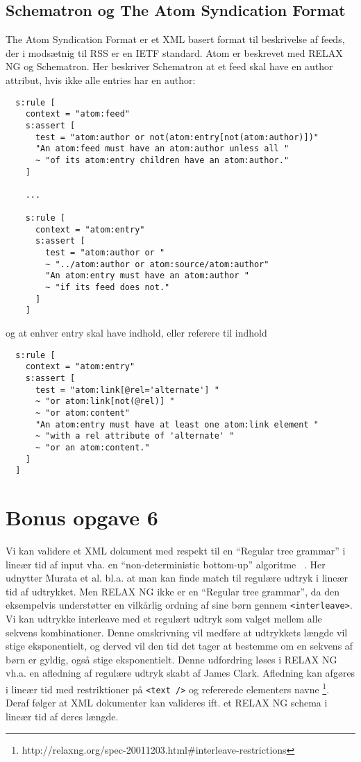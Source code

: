 \documentclass[a4paper,10pt]{article}
\begin{document}
\subsection*{Schematron og The Atom Syndication Format}
The Atom Syndication Format er et XML basert format til beskrivelse af feeds, der i modsætnig til RSS er en IETF standard.  Atom er beskrevet med RELAX NG og Schematron. Her beskriver Schematron at et feed skal have en author attribut, hvis ikke alle entries har en author: 
\begin{lstlisting}
  s:rule [
    context = "atom:feed"
    s:assert [
      test = "atom:author or not(atom:entry[not(atom:author)])"
      "An atom:feed must have an atom:author unless all "
      ~ "of its atom:entry children have an atom:author."
    ]

    ...
    
    s:rule [
      context = "atom:entry"
      s:assert [
        test = "atom:author or "
        ~ "../atom:author or atom:source/atom:author"
        "An atom:entry must have an atom:author "
        ~ "if its feed does not."
      ]
    ]
\end{lstlisting}
og at enhver entry skal have indhold, eller referere til indhold
\begin{lstlisting}
  s:rule [
    context = "atom:entry"
    s:assert [
      test = "atom:link[@rel='alternate'] "
      ~ "or atom:link[not(@rel)] "
      ~ "or atom:content"
      "An atom:entry must have at least one atom:link element "
      ~ "with a rel attribute of 'alternate' "
      ~ "or an atom:content."
    ]
  ]
\end{lstlisting}

\section*{Bonus opgave 6}
Vi kan validere et XML dokument med respekt til en ``Regular tree grammar'' i lineær tid af input vha. en ``non-deterministic bottom-up'' algoritme  ~\cite[s. 12]{Murata00taxonomyof}. Her udnytter Murata et al.  bl.a. at man kan finde match til regulære udtryk i lineær tid af udtrykket. Men RELAX NG ikke er en ``Regular tree grammar'', da den eksempelvis understøtter en vilkårlig ordning af sine børn gennem \texttt{<interleave>}. Vi kan udtrykke interleave med et regulært udtryk som valget mellem alle sekvens kombinationer. Denne omskrivning vil medføre at udtrykkets længde vil stige eksponentielt, og derved vil den tid det tager at bestemme om en sekvens af børn er gyldig, også stige eksponentielt. Denne udfordring løses i RELAX NG vh.a. en afledning af regulære udtryk skabt af James Clark. Afledning kan afgøres i lineær tid med restriktioner på \texttt{<text />} og refererede elementers navne \footnote{http://relaxng.org/spec-20011203.html\#interleave-restrictions}. Deraf følger at XML dokumenter kan valideres ift. et RELAX NG schema i lineær tid af deres længde. 


{}
 

 
\end{document}
